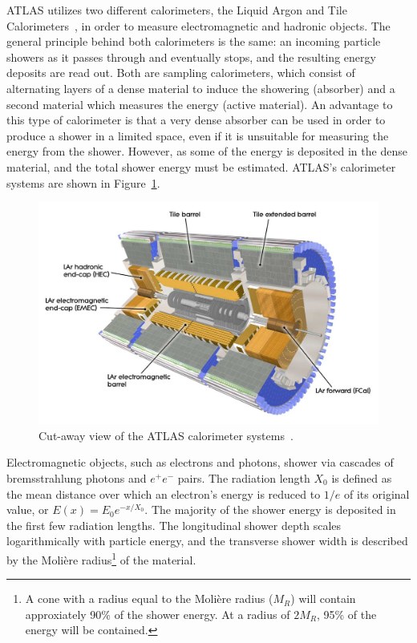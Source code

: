 ﻿ATLAS utilizes two different calorimeters, the Liquid Argon and Tile Calorimeters~\cite{1996.lar-tdr, 1996.tilecal-tdr}, in order to measure electromagnetic and hadronic objects.
The general principle behind both calorimeters is the same: an incoming particle showers as it passes through and eventually stops, and the resulting energy deposits are read out.
Both are sampling calorimeters, which consist of alternating layers of a dense material to induce the showering (absorber) and a second material which measures the energy (active material).
An advantage to this type of calorimeter is that a very dense absorber can be used in order to produce a shower in a limited space, even if it is unsuitable for measuring the energy from the shower.
However, as some of the energy is deposited in the dense material, and the total shower energy must be estimated.
ATLAS's calorimeter systems are shown in Figure~\ref{fig:calorimeters}.

\begin{figure}[htbp]
  \centering
  \includegraphics[width=.8\textwidth]{figs/detector/calorimeter}
  \caption{Cut-away view of the ATLAS calorimeter systems~\cite{2018.tilecal}.}
  \label{fig:calorimeters}
\end{figure}

Electromagnetic objects, such as electrons and photons, shower via cascades of bremsstrahlung photons and $e^+ e^-$ pairs.
The radiation length $X_0$ is defined as the mean distance over which an electron's energy is reduced to $1/e$ of its original value, or $E(x) = E_{0}e^{-x/X_0}$.
The majority of the shower energy is deposited in the first few radiation lengths.
The longitudinal shower depth scales logarithmically with particle energy, and the transverse shower width is described by the Moli\`{e}re radius\footnote{A cone with a radius equal to the Moli\`{e}re radius ($M_R$) will contain approxiately 90\% of the shower energy.  At a radius of $2M_R$, 95\% of the energy will be contained.} of the material.

